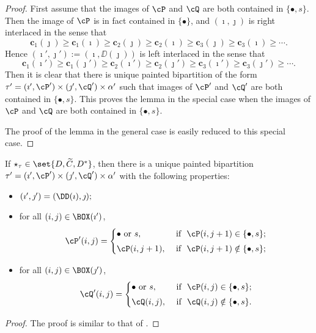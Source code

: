 \documentclass[ssunip]{subfiles}
\begin{document}
    


   \begin{proof}
    First assume that the images of $\cP$ and $\cQ$ are both contained in $\{\bullet, s\}$. Then  the image of $\cP$  is in fact contained in $\{\bullet\}$, and $(\imath, \jmath)$ is  right interlaced in the sense that 
 \[
 \mathbf{c}_1(\jmath)\geq \mathbf{c}_1(\imath)\geq \mathbf{c}_2(\jmath)\geq \mathbf{c}_2(\imath)\geq \mathbf{c}_3(\jmath)\geq \mathbf{c}_3(\imath) \geq \cdots.
 \]
 Hence $ (\imath',\jmath'):= (\imath,\DD(\jmath))$ is left interlaced in the sense that 
 \[
 \mathbf{c}_1(\imath')\geq \mathbf{c}_1(\jmath')\geq \mathbf{c}_2(\imath')\geq \mathbf{c}_2(\jmath')\geq \mathbf{c}_3(\imath')\geq \mathbf{c}_3(\jmath') \geq \cdots.
 \]
 Then it is clear that there is  unique painted bipartition of the form  $\tau'=(\imath',\cP')\times (\jmath',\cQ')\times \alpha'$ such that images of $\cP'$ and $\cQ'$ are both contained in $\{\bullet, s\}$. This proves the lemma in the special case when the images of $\cP$ and $\cQ$ are both contained in $\{\bullet, s\}$. 
 
 The proof of the lemma in the general case is easily reduced to this special case. 
   \end{proof}
    \begin{lem}\label{lemDDn2}
    If $\star_\tau \in \set{D, \widetilde C, D^*}$, then there is a unique painted bipartition $\tau'= (\imath',\cP')\times (\jmath',\cQ')\times \alpha'$ with the following properties:
  \begin{itemize}
        \item $
   (\imath',\jmath')= (\DD(\imath),\jmath); \smallskip
   $
   \item for all $(i,j)\in \BOX(\imath')$,
   \[
     \cP'(i,j)=\begin{cases}   
    \bullet \textrm{ or } s,&\textrm{ if  $\ \cP(i,j+1)\in \{\bullet, s\}$;} \smallskip \\
  \cP(i,j+1),& \textrm{ if $\ \cP(i,j+1)\notin \{\bullet, s\}$};\end{cases}
   \]
   \item for all $(i,j)\in \BOX(\jmath')$,
   \[
     \cQ'(i,j)=\begin{cases}   
    \bullet \textrm{ or } s,&\textrm{ if  $\ \cP(i,j)\in \{\bullet, s\}$;} \smallskip \\
  \cQ(i,j), & \textrm{ if $\ \cQ(i,j)\notin \{\bullet, s\}$}.  \end{cases}
   \]
  
    \end{itemize}
\end{lem}
\begin{proof}
  The proof is similar to that of . 
  
\end{proof}
\end{document}
